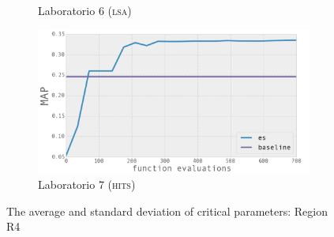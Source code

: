 \begin{figure}
\begin{subfigure}[b]{0.475\textwidth}
            \caption[]%
            {{\small Laboratorio 6 (\textsc{lsa})}}    
            \label{fig:es_lab6}
        \end{subfigure}
        \quad
        \begin{subfigure}[b]{0.475\textwidth}   
            \centering 
            \includegraphics[width=\textwidth]{figures/es_lab3.png}
            \caption[]%
            {{\small Laboratorio 7 (\textsc{hits})}}    
            \label{fig:es_lab7}
        \end{subfigure}
        \caption[ The average and standard deviation of critical parameters ]
        {\small The average and standard deviation of critical parameters: Region R4} 
        \label{fig:es_all}
\end{figure}




